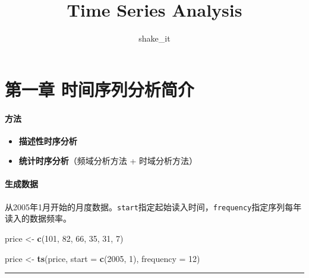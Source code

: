 \documentclass[]{article}
\title{Time Series Analysis}
\author{shake\_it}
\date{}
\newenvironment{Shaded}{\begin{snugshade}}{\end{snugshade}}
\newcommand{\DataTypeTok}[1]{\textcolor[rgb]{0.13,0.29,0.53}{#1}}
\newcommand{\DecValTok}[1]{\textcolor[rgb]{0.00,0.00,0.81}{#1}}
\newcommand{\KeywordTok}[1]{\textcolor[rgb]{0.13,0.29,0.53}{\textbf{#1}}}
\newcommand{\NormalTok}[1]{#1}
\newcommand{\StringTok}[1]{\textcolor[rgb]{0.31,0.60,0.02}{#1}}
\providecommand{\tightlist}{%
  \setlength{\itemsep}{0pt}\setlength{\parskip}{0pt}}
\let\oldparagraph\paragraph
\renewcommand{\paragraph}[1]{\oldparagraph{#1}\mbox{}}
\begin{document}
\maketitle

\hypertarget{ux7b2cux4e00ux7ae0-ux65f6ux95f4ux5e8fux5217ux5206ux6790ux7b80ux4ecb}{%
\section{第一章
时间序列分析简介}\label{ux7b2cux4e00ux7ae0-ux65f6ux95f4ux5e8fux5217ux5206ux6790ux7b80ux4ecb}}

\hypertarget{ux65b9ux6cd5}{%
\paragraph{方法}\label{ux65b9ux6cd5}}

\begin{itemize}
\tightlist
\item
  \textbf{描述性时序分析}
\item
  \textbf{统计时序分析}（频域分析方法 + 时域分析方法）
\end{itemize}

\hypertarget{ux751fux6210ux6570ux636e}{%
\paragraph{生成数据}\label{ux751fux6210ux6570ux636e}}

从2005年1月开始的月度数据。\texttt{start}指定起始读入时间，\texttt{frequency}指定序列每年读入的数据频率。

\begin{Shaded}
\begin{Highlighting}[]
\NormalTok{price <-}\StringTok{ }\KeywordTok{c}\NormalTok{(}\DecValTok{101}\NormalTok{, }\DecValTok{82}\NormalTok{, }\DecValTok{66}\NormalTok{, }\DecValTok{35}\NormalTok{, }\DecValTok{31}\NormalTok{, }\DecValTok{7}\NormalTok{)}

\NormalTok{price <-}\StringTok{ }\KeywordTok{ts}\NormalTok{(price, }\DataTypeTok{start =} \KeywordTok{c}\NormalTok{(}\DecValTok{2005}\NormalTok{, }\DecValTok{1}\NormalTok{), }\DataTypeTok{frequency =} \DecValTok{12}\NormalTok{)}
\end{Highlighting}
\end{Shaded}

\begin{center}\rule{0.5\linewidth}{\linethickness}\end{center}
\end{document}
